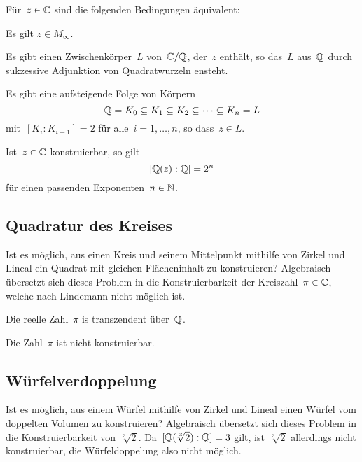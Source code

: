 \begin{theorem}
  Für~$z \in \mathbb{C}$ sind die folgenden Bedingungen äquivalent:
  \begin{equivlist}
    \item
      Es gilt $z \in M_{\infty}$.
    \item
      Es gibt einen Zwischenkörper~$L$ von~$\mathbb{C}/\mathbb{Q}$, der~$z$ enthält, so das~$L$ aus~$\mathbb{Q}$ durch sukzessive Adjunktion von Quadratwurzeln ensteht.
    \item
      Es gibt eine aufsteigende Folge von Körpern
      \[
        \mathbb{Q} = K_0 \subseteq K_1 \subseteq K_2 \subseteq \dotsb \subseteq K_n = L
      \]
      mit~$[K_i : K_{i-1}] = 2$ für alle~$i = 1, \dotsc, n$, so dass~$z \in L$.
  \end{equivlist}
\end{theorem}

\begin{corollary}
  Ist~$z \in \mathbb{C}$ konstruierbar, so gilt
  \[
    [\mathbb{Q}(z) : \mathbb{Q}] = 2^n
  \] 
  für einen passenden Exponenten~$n \in \mathbb{N}$.
\end{corollary}



\subsection{Quadratur des Kreises}

Ist es möglich, aus einen Kreis und seinem Mittelpunkt mithilfe von Zirkel und Lineal ein Quadrat mit gleichen Flächeninhalt zu konstruieren?
Algebraisch übersetzt sich dieses Problem in die Konstruierbarkeit der Kreiszahl~$\pi \in \mathbb{C}$, welche nach Lindemann nicht möglich ist.

\begin{theorem}[Lindemann]
  Die reelle Zahl~$\pi$ is transzendent über~$\mathbb{Q}$.
\end{theorem}

\begin{corollary}
  Die Zahl~$\pi$ ist nicht konstruierbar.
\end{corollary}



\subsection{Würfelverdoppelung}

Ist es möglich, aus einem Würfel mithilfe von Zirkel und Lineal einen Würfel vom doppelten Volumen zu konstruieren?
Algebraisch übersetzt sich dieses Problem in die Konstruierbarkeit von~$\sqrt[3]{2}$.
Da~$[\mathbb{Q}( \sqrt[3]{2} ) : \mathbb{Q}] = 3$ gilt, ist~$\sqrt[3]{2}$ allerdings nicht konstruierbar, die Würfeldoppelung also nicht möglich.



